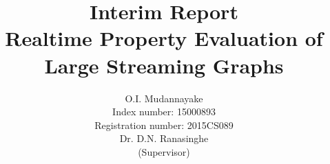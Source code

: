 \title{
    \vspace{-1.0cm}
    {\LARGE Interim Report}\\
    \vspace{0.3cm}
    {\Huge\textbf{Realtime Property Evaluation of\\Large Streaming Graphs}}
    \vspace{3cm}
}

\author{
    O.I. Mudannayake\\
    {\normalsize Index number: 15000893}\\
    {\normalsize Registration number: 2015CS089}
    \vspace{1cm}
    \\Dr. D.N. Ranasinghe\\
    {\normalsize(Supervisor)}\\
    \vspace{1cm}
}

\date{}

\usepackage{titlepic}
